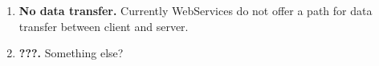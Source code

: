 %


\begin{enumerate}
\item{\bf No data transfer.}
Currently WebServices do not offer a path for data transfer between client and server.
\item{\bf ???.}
Something else?
\end{enumerate}




